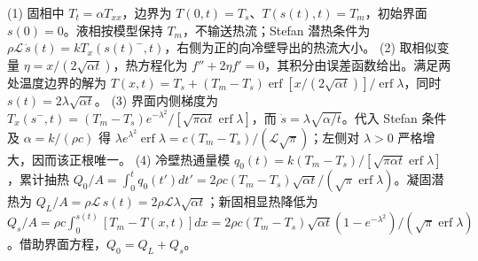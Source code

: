 (1) 固相中 \(T_t=\alpha T_{xx}\)，边界为 \(T(0,t)=T_s\)、\(T(s(t),t)=T_m\)，初始界面 \(s(0)=0\)。液相按模型保持 \(T_m\)，不输送热流；Stefan 潜热条件为 \(\rho\mathcal L\,\dot s(t)=k T_x(s(t)^-,t)\)，右侧为正的向冷壁导出的热流大小。
(2) 取相似变量 \(\eta=x/(2\sqrt{\alpha t})\)，热方程化为 \(f''+2\eta f'=0\)，其积分由误差函数给出。满足两处温度边界的解为 \(T(x,t)=T_s+(T_m-T_s)\operatorname{erf}[x/(2\sqrt{\alpha t})]/\operatorname{erf}\lambda\)，同时 \(s(t)=2\lambda\sqrt{\alpha t}\)。
(3) 界面内侧梯度为 \(T_x(s^-,t)=(T_m-T_s)e^{-\lambda^2}/[\sqrt{\pi\alpha t}\operatorname{erf}\lambda]\)，而 \(\dot s=\lambda\sqrt{\alpha/t}\)。代入 Stefan 条件及 \(\alpha=k/(\rho c)\) 得 \(\lambda e^{\lambda^2}\operatorname{erf}\lambda=c(T_m-T_s)/(\mathcal L\sqrt\pi)\)；左侧对 \(\lambda>0\) 严格增大，因而该正根唯一。
(4) 冷壁热通量模 \(q_0(t)=k(T_m-T_s)/[\sqrt{\pi\alpha t}\operatorname{erf}\lambda]\)，累计抽热 \(Q_0/A=\int_0^tq_0(t')dt'=2\rho c(T_m-T_s)\sqrt{\alpha t}/(\sqrt\pi\operatorname{erf}\lambda)\)。凝固潜热为 \(Q_L/A=\rho\mathcal L\,s(t)=2\rho\mathcal L\lambda\sqrt{\alpha t}\)；新固相显热降低为 \(Q_s/A=\rho c\int_0^{s(t)}[T_m-T(x,t)]dx=2\rho c(T_m-T_s)\sqrt{\alpha t}(1-e^{-\lambda^2})/(\sqrt\pi\operatorname{erf}\lambda)\)。借助界面方程，\(Q_0=Q_L+Q_s\)。
